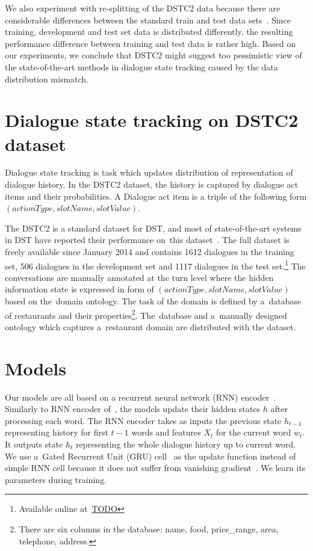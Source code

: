 \documentclass{itatnew}
\begin{document}
We also experiment with re-splitting of the DSTC2 data because there are considerable differences between the standard train and test data sets~\cite{henderson2014second}.
Since training, development and test set data is distributed differently, the resulting performance difference between training and test data is rather high.
Based on our experiments, we conclude that DSTC2 might suggest too pessimistic view of the state-of-the-art methods in dialogue state tracking caused by the data distribution mismatch.


\section{Dialogue state tracking on DSTC2 dataset}\label{sec:dst}
Dialogue state tracking is task which updates distribution of representation of dialogue history.
In the DSTC2 dataset, the history is captured by dialogue act items and their probabilities.
A Dialogue act item is a triple of the following form $(actionType, slotName, slotValue)$.

The DSTC2 is a standard dataset for DST, and most of state-of-the-art systems in DST have reported their performance on~this dataset~\cite{henderson2014second}. 
The full dataset is freely available since January 2014 and contains 1612 dialogues in the training set, 506 dialogues in the development set and 1117 dialogues in the test set.\footnote{Available online at~\url{TODO}}
The conversations are manually annotated at the turn level where the hidden information state is expressed in form of $(actionType, slotName, slotValue)$ based on the~domain ontology.
The task of the domain is defined by a~database of restaurants and their properties\footnote{There are six columns in the database: name, food, price\_range, area, telephone, address.}.
The~database and a~manually designed ontology which captures a~restaurant domain are distributed with the dataset.

\section{Models}\label{sec:model}
Our models are all based on a recurrent neural network (RNN) encoder~\cite{werbos1990backpropagation}. 
Similarly to RNN encoder of~\cite{zilka2015incremental}, the models update their hidden states $h$ after processing each word. 
The RNN encoder takes as inputs the previous state $h_{t-1}$ representing history for first $t-1$ words and features $X_t$ for the current word $w_t$. 
It outputs state $h_t$ representing the whole dialogue history up to current word.
We use a~Gated Recurrent Unit (GRU) cell~\cite{cho2014gru} as the update function instead of simple RNN cell because it does not suffer from vanishing gradient~\cite{TODO_vanishing_gradient}.
We learn its parameters during training.
\end{document}
